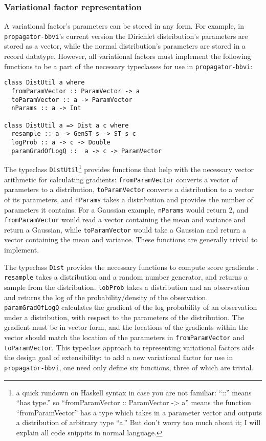 \documentclass[12pt]{article}
\begin{document}
\subsubsection{Variational factor representation}

A variational factor's parameters can be stored in any form. For
example, in \texttt{propagator-bbvi}'s current version the Dirichlet
distribution's parameters are stored as a vector, while the normal
distribution's parameters are stored in a record datatype. However,
all variational factors must implement the following functions to be a
part of the necessary typeclasses for use in
\texttt{propagator-bbvi}:

\begin{verbatim}
class DistUtil a where
  fromParamVector :: ParamVector -> a
  toParamVector :: a -> ParamVector
  nParams :: a -> Int

class DistUtil a => Dist a c where
  resample :: a -> GenST s -> ST s c
  logProb :: a -> c -> Double
  paramGradOfLogQ ::  a -> c -> ParamVector
\end{verbatim}

The typeclass \texttt{DistUtil}\footnote{a quick rundown on Haskell
  syntax in case you are not familiar: ``::'' means ``has type.'' so
  ``fromParamVector :: ParamVector -> a'' means the function
  ``fromParamVector'' has a type which takes in a parameter vector and
  outputs a distribution of arbitrary type ``a.'' But don't worry too
  much about it; I will explain all code snippits in normal language.}
provides functions that help with the necessary vector arithmetic for
calculating gradients: \texttt{fromParamVector} converts a vector of
parameters to a distribution, \texttt{toParamVector} converts a
distribution to a vector of its parameters, and \texttt{nParams} takes a
distribution and provides the number of parameters it contains. For a
Gaussian example, \texttt{nParams} would return 2, and
\texttt{fromParamVector} would read a vector containing the mean and
variance and return a Gaussian, while \texttt{toParamVector} would
take a Gaussian and return a vector containing the mean and
variance. These functions are generally trivial to implement.

The typeclass \texttt{Dist} provides the necessary functions to
compute score gradients \citep{ranganath-2014}. \texttt{resample}
takes a distribution and a random number generator, and returns a
sample from the distribution. \texttt{lobProb} takes a distribution
and an observation and returns the log of the probability/density of the
observation. \texttt{paramGradOfLogQ} calculates the gradient of the
log probability of an observation under a distribution, with respect to
the parameters of the distribution. The gradient must be in vector
form, and the locations of the gradients within the vector should
match the location of the parameters in \texttt{fromParamVector} and
\texttt{toParamVector}. This typeclass approach to representing
variational factors aids the design goal of extensibility: to add a
new variational factor for use in \texttt{propagator-bbvi}, one need
only define six functions, three of which are trivial.
\end{document}

